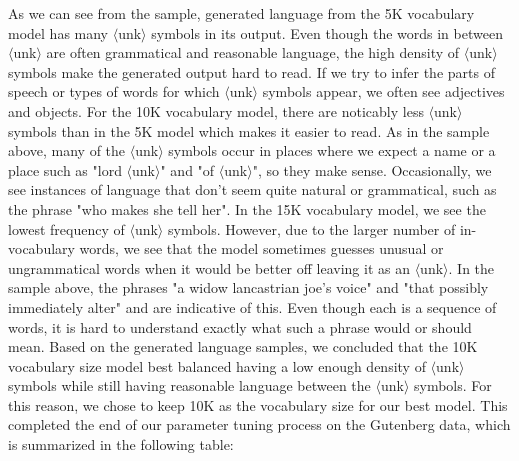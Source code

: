 \documentclass[a4paper]{article}
\begin{document}
As we can see from the sample, generated language from the 5K vocabulary model has many $\langle$unk$\rangle$ symbols in its output. Even though the words in between $\langle$unk$\rangle$ are often grammatical and reasonable language, the high density of $\langle$unk$\rangle$ symbols make the generated output hard to read. If we try to infer the parts of speech or types of words for which $\langle$unk$\rangle$ symbols appear, we often see adjectives and objects.
\newline
\newline
For the 10K vocabulary model, there are noticably less $\langle$unk$\rangle$ symbols than in the 5K model which makes it easier to read. As in the sample above, many of the $\langle$unk$\rangle$ symbols occur in places where we expect a name or a place such as "lord $\langle$unk$\rangle$" and "of $\langle$unk$\rangle$", so they make sense. Occasionally, we see instances of language that don't seem quite natural or grammatical, such as the phrase "who makes she tell her".
\newline
\newline
In the 15K vocabulary model, we see the lowest frequency of $\langle$unk$\rangle$ symbols. However, due to the larger number of in-vocabulary words, we see that the model sometimes guesses unusual or ungrammatical words when it would be better off leaving it as an $\langle$unk$\rangle$. In the sample above, the phrases "a widow lancastrian joe's voice" and "that possibly immediately alter" and are indicative of this. Even though each is a sequence of words, it is hard to understand exactly what such a phrase would or should mean. 
\newline
\newline
Based on the generated language samples, we concluded that the 10K vocabulary size model best balanced having a low enough density of $\langle$unk$\rangle$ symbols while still having reasonable language between the $\langle$unk$\rangle$ symbols. For this reason, we chose to keep 10K as the vocabulary size for our best model. This completed the end of our parameter tuning process on the Gutenberg data, which is summarized in the following table:
\end{document}

